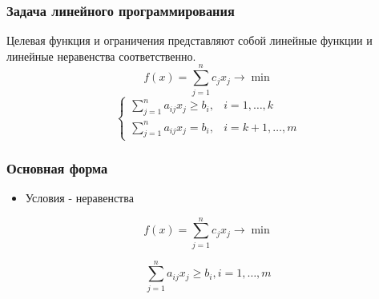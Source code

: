 \documentclass[12pt]{beamer}
\begin{document}
	\begin{frame}[plain]
		\maketitle
	\end{frame}
	
	\begin{frame}
		\frametitle{}
	\end{frame}
	\begin{frame}
	\frametitle{Задача линейного программирования}
	Целевая функция и ограничения представляют собой линейные функции и линейные неравенства соответственно. 
	\begin{equation*}
		f(x)=\sum_{j=1}^n c_j x_j \to \min
	\end{equation*}
	\begin{equation*}
		\begin{cases}	
			\sum_{j=1}^n a_{ij} x_j \geq b_i, &  i=1,\dots, k\\
			\sum_{j=1}^n a_{ij} x_j= b_i, & i=k+1,\dots,m
		\end{cases}
	\end{equation*}
	\end{frame}
	\begin{frame}
	\frametitle{Основная форма}
	\begin{itemize}
	\item Условия - неравенства 
\end{itemize}
	\begin{equation*}
		f(x)=\sum_{j=1}^n c_j x_j \to \min
	\end{equation*}
	
	\begin{equation*}
			\sum_{j=1}^n a_{ij} x_j \geq b_i, i=1,\dots, m
	\end{equation*}
\end{frame}
\end{document}
